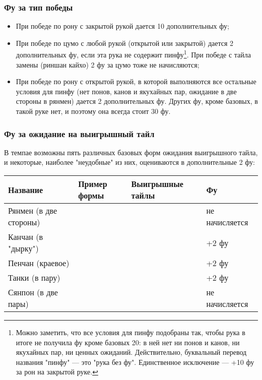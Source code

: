 \subsubsection{Фу за тип победы}

\begin{itemize}
	\item При победе по рону с закрытой рукой дается 10 дополнительных фу;
	\item При победе по цумо с любой рукой (открытой или закрытой) дается 2 дополнительных фу, если эта рука не содержит пинфу\footnote{Можно заметить, что все условия для пинфу подобраны так, чтобы рука в итоге не получила фу кроме базовых 20: в ней нет ни понов и канов, ни якухайных пар, ни ценных ожиданий. Действительно, буквальный перевод названия "пинфу" --- это "рука без фу". Единственное исключение --- +10 фу за рон на закрытой руке.}. При победе с тайла замены (риншан кайхо) 2 фу за цумо тоже не начисляются;
	\item При победе по рону с открытой рукой, в которой выполняются все остальные условия для пинфу (нет понов, канов и якухайных пар, ожидание в две стороны в рянмен) дается 2 дополнительных фу. Других фу, кроме базовых, в такой руке нет, и поэтому она всегда стоит 30 фу.
\end{itemize}

\subsubsection{Фу за ожидание на выигрышный тайл}

В темпае возможны пять различных базовых форм ожидания выигрышного тайла, и некоторые, наиболее "неудобные" из них, оцениваются в дополнительные 2 фу:

\noindent\begin{tabular}{C{3cm}C{5cm}C{3cm}C{3cm}}
\toprule
	Название  &
	Пример формы &
	Выигрышные тайлы &
	Фу \\
\midrule
	\rule[0ex]{0pt}{5ex} Рянмен \newline (в две стороны) \newline &
	 &
	 &
	не начисляется \\
\midrule
	\rule[0ex]{0pt}{5ex} Канчан \newline (в "дырку") \newline &
	 &
	 &
	+2 фу \\
\midrule
	\rule[0ex]{0pt}{5ex} Пенчан \newline (краевое) \newline &
	 &
	 &
	+2 фу \\
\midrule
	\rule[0ex]{0pt}{5ex} Танки \newline (в пару) \newline &
	 &
	 &
	+2 фу \\
\midrule
	\rule[0ex]{0pt}{5ex} Сянпон \newline (в две пары) \newline &
	  &
	 &
	не начисляется \\
\bottomrule
\end{tabular}

